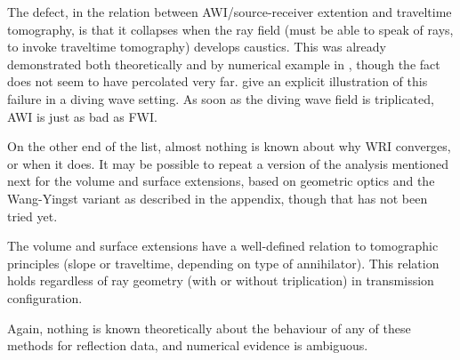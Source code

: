 The defect, in the relation between AWI/source-receiver extention and traveltime tomography, is that it collapses when the ray field (must be able to speak of rays, to invoke traveltime tomography) develops caustics. This was already demonstrated both theoretically and by numerical example in \cite[]{Symes:94c}, though the fact does not seem to have percolated very far. \cite{HuangSymes:17} give an explicit illustration of this failure in a diving wave setting. As soon as the diving wave field is triplicated, AWI is just as bad as FWI.

On the other end of the list, almost nothing is known about why WRI converges, or when it does. It may be possible to repeat a version of the analysis mentioned next for the volume and surface extensions, based on geometric optics and the Wang-Yingst variant as described in the appendix, though that has not been tried yet.

The volume and surface extensions have a well-defined relation to tomographic principles (slope or traveltime, depending on type of annihilator). This relation holds regardless of ray geometry (with or without triplication) in transmission configuration.

Again, nothing is known theoretically about the behaviour of any of these methods for reflection data, and numerical evidence is ambiguous.

%





%
%
%

